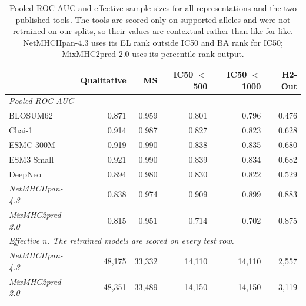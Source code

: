 
\begin{table}[H]
\centering
\small
\caption{Pooled ROC-AUC and effective sample sizes for all representations and the two published tools. The tools are scored only on supported alleles and were not retrained on our splits, so their values are contextual rather than like-for-like. NetMHCIIpan-4.3 uses its EL rank outside IC50 and BA rank for IC50; MixMHC2pred-2.0 uses its percentile-rank output.}
\label{tab:supp-ref-pooled}
\begin{tabular}{lrrrrr}
\toprule
 & \textbf{Qualitative} & \textbf{MS} & \textbf{IC50 $<$500} & \textbf{IC50 $<$1000} & \textbf{H2-Out} \\
\midrule
\multicolumn{6}{l}{\textit{Pooled ROC-AUC}} \\
BLOSUM62 & 0.871 & 0.959 & 0.801 & 0.796 & 0.476 \\
Chai-1 & 0.914 & 0.987 & 0.827 & 0.823 & 0.628 \\
ESMC 300M & 0.919 & 0.990 & 0.838 & 0.835 & 0.680 \\
ESM3 Small & 0.921 & 0.990 & 0.839 & 0.834 & 0.682 \\
DeepNeo & 0.894 & 0.980 & 0.830 & 0.822 & 0.529 \\
\textit{NetMHCIIpan-4.3} & 0.838 & 0.974 & 0.909 & 0.899 & 0.883 \\
\textit{MixMHC2pred-2.0} & 0.815 & 0.951 & 0.714 & 0.702 & 0.875 \\
\midrule
\multicolumn{6}{l}{\textit{Effective $n$. The retrained models are scored on every test row.}} \\
\textit{NetMHCIIpan-4.3} & 48,175 & 33,332 & 14,110 & 14,110 & 2,557 \\
\textit{MixMHC2pred-2.0} & 48,351 & 33,489 & 14,150 & 14,150 & 3,119 \\
\bottomrule
\end{tabular}
\end{table}

